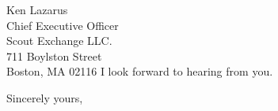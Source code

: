\documentclass[11pt]{letter} %
\begin{document}
\begin{letter}{Ken Lazarus \\
Chief Executive Officer \\
Scout Exchange LLC. \\
711 Boylston Street \\
Boston, MA 02116 
}
I look forward to hearing from you.

\closing{Sincerely yours,}




\end{letter}
\end{document}
